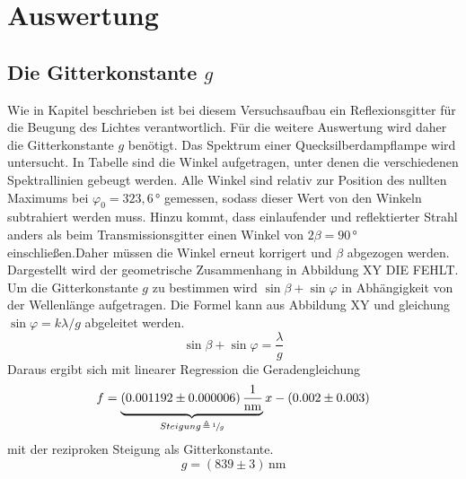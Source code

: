 \section{Auswertung}
\label{sec:Auswertung}

\subsection{Die Gitterkonstante $g$}

Wie in Kapitel %
 beschrieben ist bei diesem Versuchsaufbau ein Reflexionsgitter für die Beugung des Lichtes verantwortlich. Für die weitere Auswertung wird daher die Gitterkonstante $g$ benötigt. Das Spektrum einer Quecksilberdampflampe wird untersucht. In Tabelle %
 sind die Winkel aufgetragen, unter denen die verschiedenen Spektrallinien gebeugt werden. Alle Winkel sind relativ zur Position des nullten Maximums bei $\varphi_0=323,6\,\si\degree$ gemessen, sodass dieser Wert von den Winkeln subtrahiert werden muss. Hinzu kommt, dass einlaufender und reflektierter Strahl anders als beim Transmissionsgitter einen Winkel von $2\beta=90\,\si\degree$ einschließen.Daher müssen die Winkel erneut korrigert und $\beta$ abgezogen werden. Dargestellt wird der geometrische Zusammenhang in Abbildung XY DIE FEHLT.
Um die Gitterkonstante $g$ zu bestimmen wird $\sin{\beta}+\sin{\varphi}$ in Abhängigkeit von der Wellenlänge aufgetragen. Die Formel kann aus Abbildung XY und gleichung $\sin{\varphi}=k\lambda/g$ abgeleitet werden. 
\begin{equation}
\sin{\beta}+\sin{\varphi}=\frac{\lambda}{g}
\end{equation}
Daraus ergibt sich mit linearer Regression die Geradengleichung
\begin{equation}
f= \underbrace{(0.001192 \pm 0.000006)\,\frac{1}{\si{\nano\meter}}}_{Steigung\,\triangleq\,\sfrac{1}{g}}x-(0.002 \pm 0.003)
\label{eq:lin_reg}
\end{equation}
mit der reziproken Steigung als Gitterkonstante.
\begin{equation}
g=(839 \pm 3)\,\si{\nano\meter}
\label{eq:gitterkonst}
\end{equation}

